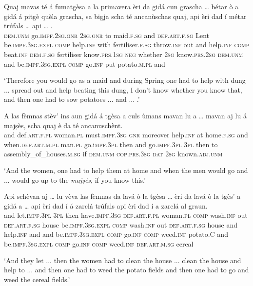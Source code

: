 \begin{linenumbers}
	\gll Quaj mavas té á fumatgèsa a la primavera èri da gidá cun grascha … bétar ò a gidá á pitgè quèla grascha, sa bigja scha té ancanùschas quaj, api èri dad í métar trúfals … api … .\\
	\textsc{dem.unm} go.\textsc{impf.2sg.gnr} \textsc{2sg.gnr} to maid.\textsc{f.sg} and \textsc{def.art.f.sg} Lent be.\textsc{impf.3sg.expl} \textsc{comp} help.\textsc{inf} with fertiliser.\textsc{f.sg} {} throw.\textsc{inf} out and help.\textsc{inf} \textsc{comp} beat.\textsc{inf} \textsc{dem.f.sg} fertiliser know.\textsc{prs.1sg} \textsc{neg} whether \textsc{2sg} know.\textsc{prs.2sg} \textsc{dem.unm} and be.\textsc{impf.3sg.expl} \textsc{comp} go.\textsc{inf} put potato.\textsc{m.pl} {} and\\
\end{linenumbers}
\medskip
\glt `Therefore you would go as a maid and during Spring one had to help with dung ... spread out and help beating this dung, I don't know whether you know that, and then one had to sow potatoes ... and ... .'
\medskip

\begin{linenumbers}
\gll A las fèmnas stèv’ ins aun gidá á tgèsa a culs ùmans mavan lu a … mavan aj lu á majṣès, scha quaj è da té ancanuschènt.\\
and def.\textsc{art.f.pl} woman.\textsc{pl} must.\textsc{impf.3sg} \textsc{gnr} moreover help.\textsc{inf} at home.\textsc{f.sg} and when.\textsc{def.art.m.pl} man.\textsc{pl} go.i\textsc{mpf.3pl} then and {} go.\textsc{impf.3pl} \textsc{3pl} then to assembly\_of\_houses.\textsc{m.sg} if \textsc{dem.unm} \textsc{cop.prs.3sg} \textsc{dat} \textsc{2sg} known.\textsc{adj.unm}\\
\end{linenumbers}
\medskip
\glt `And the women, one had to help them at home and when the men would go and ... would go up to the \textit{majṣès}, if you know this.'
\medskip


\begin{linenumbers}
	\gll Api schèvan aj … lu vèva las fèmnas da lavá ò la tgèsa … èri da lavá ò la tgès’ a gidá a … api èri dad í á zarclá trúfals api èri dad í a zarclá al graun.   \\
	and let.\textsc{impf.3pl} \textsc{3pl} {} then have.\textsc{impf.3sg} \textsc{def.art.f.pl} woman.\textsc{pl} \textsc{comp} wash.\textsc{inf} out \textsc{def.art.f.sg} house {} be.\textsc{impf.3sg.expl} \textsc{comp} wash.\textsc{inf} out \textsc{def.art.f.sg} house and  help.\textsc{inf} and {} and be.\textsc{impf.3sg.expl} \textsc{comp} go.\textsc{inf} \textsc{comp} weed.\textsc{inf} potato.C and be.\textsc{impf.3sg.expl} \textsc{comp} go.\textsc{inf} \textsc{comp} weed.\textsc{inf} \textsc{def.art.m.sg} cereal\\
\end{linenumbers}
\medskip
\glt `And they let ... then the women had to clean the house ... clean the house and help to ... and then one had to weed the potato fields and then one had to go and weed the cereal fields.'
\medskip


